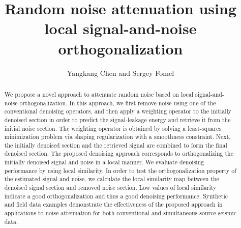 
\title{Random noise attenuation using local signal-and-noise orthogonalization}
\renewcommand{\thefootnote}{\fnsymbol{footnote}}
\author{Yangkang Chen and Sergey Fomel}


\address{
Bureau of Economic Geology \\
John A. and Katherine G. Jackson School of Geosciences \\
The University of Texas at Austin \\
University Station, Box X \\
Austin, TX 78713-8924 \\
}

\maketitle

\begin{abstract}
We propose a novel approach to attenuate random noise based on local signal-and-noise orthogonalization. In this approach, we first  %
remove noise using one of the conventional denoising operators, and then apply a weighting operator to the initially denoised section in order to predict the signal-leakage energy and retrieve it from the initial noise section. The weighting operator is obtained by solving a least-squares minimization problem via shaping regularization with a smoothness constraint. Next, the initially denoised section and the retrieved signal are combined to form the final denoised section. The proposed denoising approach corresponds to orthogonalizing the initially denoised signal and noise in a local manner. %
We evaluate denoising performance by using local similarity. In order to test the orthogonalization property of the estimated signal and noise, we calculate the local similarity map between the denoised signal section and removed noise section. Low values of local similarity indicate a good orthogonalization and thus a good denoising performance. Synthetic and field data examples demonstrate the effectiveness of the proposed approach in applications to noise attenuation for both conventional and simultaneous-source seismic data.
\end{abstract}


